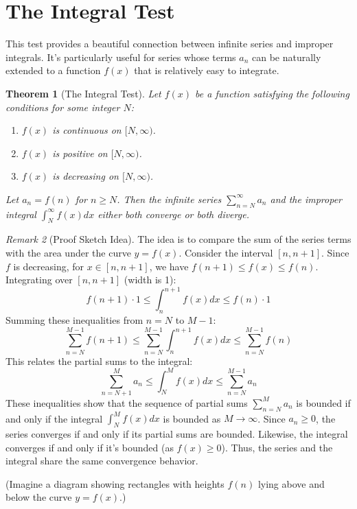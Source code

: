 \documentclass[11pt]{article}
\theoremstyle{plain}
\newtheorem{theorem}{Theorem}[section]
\theoremstyle{definition}
\theoremstyle{remark}
\newtheorem{remark}[theorem]{Remark}
\theoremstyle{adminstyle}
\begin{document}
\section{The Integral Test}

This test provides a beautiful connection between infinite series and improper integrals. It's particularly useful for series whose terms $a_n$ can be naturally extended to a function $f(x)$ that is relatively easy to integrate.

\begin{theorem}[The Integral Test]
Let $f(x)$ be a function satisfying the following conditions for some integer $N$:
\begin{enumerate}
    \item $f(x)$ is continuous on $[N, \infty)$.
    \item $f(x)$ is positive on $[N, \infty)$.
    \item $f(x)$ is decreasing on $[N, \infty)$.
\end{enumerate}
Let $a_n = f(n)$ for $n \ge N$. Then the infinite series $\sum_{n=N}^{\infty} a_n$ and the improper integral $\int_N^\infty f(x) dx$ either both converge or both diverge.
\end{theorem}

\begin{remark}[Proof Sketch Idea]
The idea is to compare the sum of the series terms with the area under the curve $y=f(x)$.
Consider the interval $[n, n+1]$. Since $f$ is decreasing, for $x \in [n, n+1]$, we have $f(n+1) \le f(x) \le f(n)$.
Integrating over $[n, n+1]$ (width is 1):
\[ f(n+1) \cdot 1 \le \int_n^{n+1} f(x) dx \le f(n) \cdot 1 \]
Summing these inequalities from $n=N$ to $M-1$:
\[ \sum_{n=N}^{M-1} f(n+1) \le \sum_{n=N}^{M-1} \int_n^{n+1} f(x) dx \le \sum_{n=N}^{M-1} f(n) \]
This relates the partial sums to the integral:
\[ \sum_{n=N+1}^{M} a_n \le \int_N^M f(x) dx \le \sum_{n=N}^{M-1} a_n \]
These inequalities show that the sequence of partial sums $\sum_{n=N}^M a_n$ is bounded if and only if the integral $\int_N^M f(x) dx$ is bounded as $M \to \infty$. Since $a_n \ge 0$, the series converges if and only if its partial sums are bounded. Likewise, the integral converges if and only if it's bounded (as $f(x) \ge 0$). Thus, the series and the integral share the same convergence behavior.
\begin{center}
    (Imagine a diagram showing rectangles with heights $f(n)$ lying above and below the curve $y=f(x)$.)
\end{center}
\end{remark}
\end{document}

